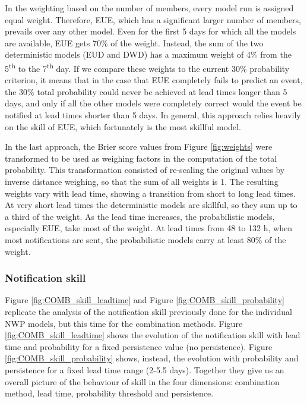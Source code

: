 \documentclass[preprint,12pt]{elsarticle}
\begin{document}
In the weighting based on the number of members, every model run is assigned equal weight. Therefore, EUE, which has a significant larger number of members, prevails over any other model. Even for the first 5 days for which all the models are available, EUE gets 70\% of the weight. Instead, the sum of the two deterministic models (EUD and DWD) has a maximum weight of 4\% from the 5\textsuperscript{th} to the 7\textsuperscript{th} day. If we compare these weights to the current 30\% probability criterion, it means that in the case that EUE completely fails to predict an event, the 30\% total probability could never be achieved at lead times longer than 5 days, and only if all the other models were completely correct would the event be notified at lead times shorter than 5 days. In general, this approach relies heavily on the skill of EUE, which fortunately is the most skillful model.

In the last approach, the Brier score values from Figure \ref{fig:weights} were transformed to be used as weighing factors in the computation of the total probability. This transformation consisted of re-scaling the original values by inverse distance weighing, so that the sum of all weights is 1. The resulting weights vary with lead time, showing a transition from short to long lead times. At very short lead times the deterministic models are skillful, so they sum up to a third of the weight. As the lead time increases, the probabilistic models, especially EUE, take most of the weight. At lead times from 48 to 132 h, when most notifications are sent, the probabilistic models carry at least 80\% of the weight.

\subsubsection{Notification skill}
\label{sec:COM_not_skill}

Figure \ref{fig:COMB_skill_leadtime} and Figure \ref{fig:COMB_skill_probability} replicate the analysis of the notification skill previously done for the individual NWP models, but this time for the combination methods. Figure \ref{fig:COMB_skill_leadtime} shows the evolution of the notification skill with lead time and probability for a fixed persistence value (no persistence). Figure \ref{fig:COMB_skill_probability} shows, instead, the evolution with probability and persistence for a fixed lead time range (2-5.5 days). Together they give us an overall picture of the behaviour of skill in the four dimensions: combination method, lead time, probability threshold and persistence.
\end{document}
